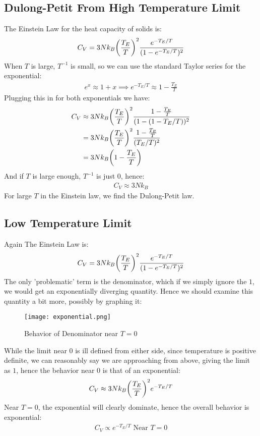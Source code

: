 \documentclass[12pt]{article}
\begin{document}
\subsection{Dulong-Petit From High Temperature Limit}
The Einstein Law for the heat capacity of solids is:
\begin{align*}
  C_V=3Nk_B\qty(\frac{T_E}{T})^2\frac{e^{-T_E/T}}{(1-e^{-T_E/T})^2}
\end{align*}
When $T$ is large, $T^{-1}$ is small, so we can use the standard Taylor series for the exponential:
\begin{align*}
  e^x\approx 1+x\implies e^{-T_E/T}\approx 1-\frac{T_E}{T}
\end{align*}
Plugging this in for both exponentials we have:
\begin{align*}
  C_V&\approx3Nk_B\qty(\frac{T_E}T)^2\frac{1-\frac{T_E}{T}}{(1-(1-T_E/T))^2}\\
  &=3Nk_B\qty(\frac{T_E}T)^2\frac{1-\frac{T_E}{T}}{(T_E/T)^2}\\
  &=3Nk_B\qty(1-\frac{T_E}{T})
\end{align*}
And if $T$ is large enough, $T^{-1}$ is just 0, hence:
\begin{align}
  \boxed{C_V\approx 3Nk_B}
\end{align}
For large $T$ in the Einstein law, we find the Dulong-Petit law.

\subsection{Low Temperature Limit}
Again The Einstein Law is:
\begin{align*}
  C_V=3Nk_B\qty(\frac{T_E}{T})^2\frac{e^{-T_E/T}}{(1-e^{-T_E/T})^2}
\end{align*}
The only 'problematic' term is the denominator, which if we simply ignore the $1$, we would get an exponentially diverging quantity. Hence we should examine this quantity a bit more, possibly by graphing it:
\begin{figure}[H]
  \centering
  \texttt{[image: exponential.png]}
  \caption{Behavior of Denominator near $T=0$}
\end{figure}
While the limit near $0$ is ill defined from either side, since temperature is positive definite, we can reasonably say we are approaching from above, giving the limit as $1$, hence the behavior near $0$ is that of an exponential:
\begin{align*}
  C_V\approx3Nk_B\qty(\frac{T_E}{T})^2e^{-T_E/T}
\end{align*}
Near $T=0$, the exponential will clearly dominate, hence the overall behavior is exponential:
\begin{align}
  \boxed{C_V\propto e^{-T_E/T}\text{ Near $T=0$}}
\end{align}
\end{document}
